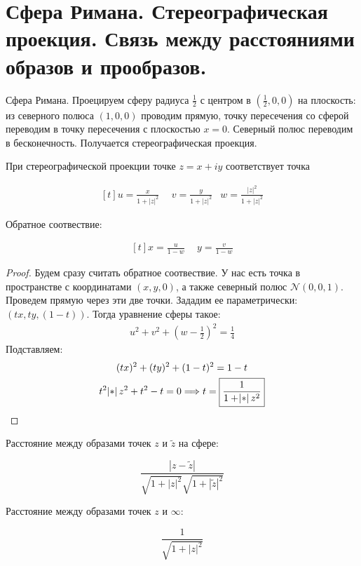 \section{Сфера Римана. Стереографическая проекция. Связь между расстояниями образов и прообразов.}

\begin{definition}
    Сфера Римана.
    Проецируем сферу радиуса $\frac12$ с центром в $(\frac12, 0, 0)$
    на плоскость: из северного полюса $(1, 0, 0)$
    проводим прямую, точку пересечения со сферой переводим
    в точку пересечения с плоскостью $x = 0$. Северный полюс
    переводим в бесконечность.
    Получается стереографическая проекция.
\end{definition}

\begin{theorem}
    При стереографической проекции точке $z = x + iy$
    соответствует точка

    \[
        \begin{aligned}[t]
            u = \frac{x}{1+|z|^2} & \ \ %
            v = \frac{y}{1+|z|^2} &
            w = \frac{|z|^2}{1+|z|^2}
        \end{aligned}
    \]

    Обратное соотвествие:

    \[
        \begin{aligned}[t]
            x = \frac{u}{1-w} & \ \ %
            y = \frac{v}{1-w}
        \end{aligned}
    \]
\end{theorem}

\begin{proof}
    Будем сразу считать обратное соотвествие. У нас есть точка в пространстве с координатами $(x, y, 0)$, а также северный полюс $\mathcal{N}(0, 0, 1)$. Проведем прямую через эти две точки. Зададим ее параметрически: $(t x, t y, (1-t))$. Тогда уравнение сферы такое: 
    \begin{gather*}
        u^2 + v^2 +  \left(w - \frac{1}{2}\right)^2 = \frac{1}{4}
    \end{gather*} 
    Подставляем: 
    \begin{gather*}
        (tx)^2 + (ty)^2 + (1-t)^2 = 1 - t \\ 
        t^2 \abs{z}^2 + t^2  - t = 0 \Longrightarrow t = \boxed{\frac{1}{1 + \abs{z}^2}}
    \end{gather*}
\end{proof}

\begin{consequence}
    Расстояние между образами точек $z$ и $\widetilde z$
    на сфере:

    \[
        \frac{|z-\widetilde z|}{\sqrt{1+|z|^2}\sqrt{1+|\widetilde z|^2}}
    \]

    Расстояние между образами точек $z$ и $\infty$:

    \[
        \frac{1}{\sqrt{1+|z|^2}}
    \]
\end{consequence}

